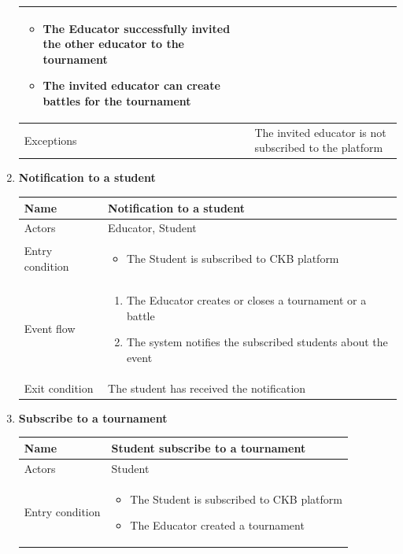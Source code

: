 \begin{enumerate}[label=UC\arabic*:]
\begin{tabular}{|p{3cm}|p{8cm}|}
\begin{itemize}
            \item The Educator successfully invited the other educator to the tournament
            \item The invited educator can create battles for the tournament
        \end{itemize} \\
        \hline
        Exceptions & The invited educator is not subscribed to the platform \\
        \hline
    \end{tabular}
    \item \textbf{Notification to a student} \\
    \begin{tabular}{|p{3cm}|p{8cm}|}
        \hline
        Name & Notification to a student \\
        \hline
        Actors & Educator, Student \\
        \hline
        Entry condition &
        \begin{itemize}
            \item The Student is subscribed to CKB platform
        \end{itemize}
        \\
        \hline
        Event flow &
        \begin{enumerate}[label=\arabic*.]
            \item The Educator creates or closes a tournament or a battle
            \item The system notifies the subscribed students about the event
        \end{enumerate}
        \\
        \hline
        Exit condition & The student has received the notification   \\
        \hline
    \end{tabular}
    \item \textbf{Subscribe to a tournament} \\
    \begin{tabular}{|p{3cm}|p{8cm}|}
        \hline
        Name & Student subscribe to a tournament \\
        \hline
        Actors & Student \\
        \hline
        Entry condition &
        \begin{itemize}
            \item The Student is subscribed to CKB platform
            \item The Educator created a tournament

\end{itemize}
\end{tabular}
\end{enumerate}
